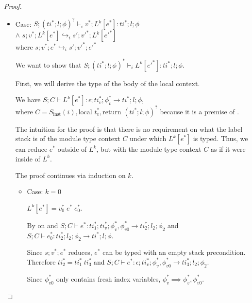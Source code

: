 \begin{proof}
\begin{itemize}
            Finally, $S;(ti^{*};l;\phi)^{?} \vdash_i v_0^{*};\<local>\{i;v'^{*}\}\; e'^{*} : ti^{*};l;\phi$ and $\vdash s' : S$.

        \item Case: $S;(ti^{*};l;\phi)^{?} \vdash_i v^{*};L^{k}[e^{*}] : ti^{*};l;\phi$
        \\ $\land$ $s;v^{*};L^{k}[e^{*}] \hookrightarrow_i s';v'^{*};L^{k}[e'^{*}]$
        \\ where $s;v^{*};e^{*} \hookrightarrow_i s';v'^{*};e'^{*}$

            We want to show that $S;(ti^{*};l;\phi)^{*} \vdash_i L^k[e'^{*}] : ti^{*};l;\phi$.

            First, we will derive the type of the body of the local context.

            We have $S;C \vdash L^k[e^{*}] : \epsilon;ti_v^{*};\phi_v^{*} \rightarrow ti^{*};l;\phi$, \\
            where $C = S_\text{inst}(i),\text{local } t_v^{*},\text{return } (ti^{*};l;\phi)^{?}$ because it is a premise of .

            The intuition for the proof is that there is no requirement on what the label stack is of the module type context $C$ under which $L^k[e^{*}]$ is typed.
            Thus, we can reduce $e^{*}$ outside of $L^k$, but with the module type context $C$ as if it were inside of $L^k$.

            The proof continues via induction on $k$.
            \begin{itemize}
                \item Case: $k = 0$

                    $L^k[e^{*}] = v_0^{*}\; e^{*}\; e_0^{*}$.

                    By  on  and 
                    $S;C \vdash e^{*} : ti_1^{*};ti_v^{*};\phi_v^{*},\phi_{v0}^{*} \rightarrow ti_2^{*};l_2;\phi_2$ and
                    \\$S;C \vdash e_0^{*} : ti_2^{*};l_2;\phi_2 \rightarrow ti^{*};l;\phi$.

                    Since $s;v^{*};e^{*}$ reduces, $e^{*}$ can be typed with an empty stack precondition.
                    Therefore $ti_2^{*} = ti_1^{*}\;ti_3^{*}$ and $S;C \vdash e^{*} : \epsilon;ti_v^{*};\phi_v^{*},\phi_{v0}^{*} \rightarrow ti_3^{*};l_2;\phi_2$.

                    Since $\phi_{v0}^{*}$ only contains fresh index variables, $\phi_v^{*} \implies \phi_v^{*},\phi_{v0}^{*}$.


\end{itemize}
\end{itemize}
\end{proof}
